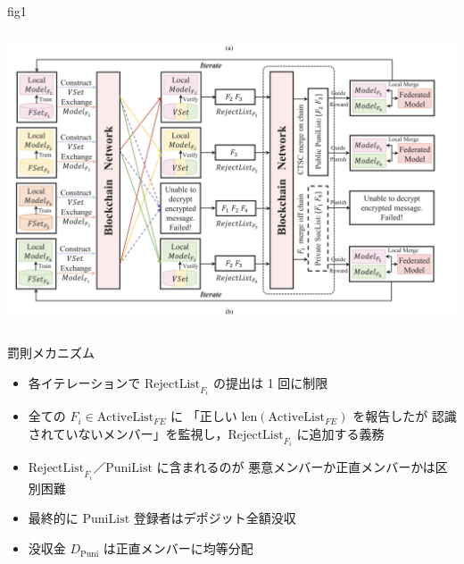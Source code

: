\documentclass[unicode,12pt,aspectratio=169, dvipdfmx]{beamer}
\begin{document}
  \begin{frame}{fig1}
    \begin{columns}
        \begin{column}[T]{.8\linewidth}
            \includegraphics[scale=0.6]{figures/fig1-1.png}                    
        \end{column}
    \end{columns}
\end{frame}



  \begin{frame}{罰則メカニズム}
    \begin{itemize}
      \item 各イテレーションで \(\mathrm{RejectList}_{F_i}\) の提出は 1 回に制限
      \item 全ての \(F_i\in \mathrm{ActiveList}_{FE}\) に
        「正しい \(\mathrm{len}(\mathrm{ActiveList}_{FE})\) を報告したが
        認識されていないメンバー」を監視し，\(\mathrm{RejectList}_{F_i}\) に追加する義務
      \item \(\mathrm{RejectList}_{F_i}\)／\(\mathrm{PuniList}\) に含まれるのが
        悪意メンバーか正直メンバーかは区別困難
      \item 最終的に \(\mathrm{PuniList}\) 登録者はデポジット全額没収
      \item 没収金 \(D_{\mathrm{Puni}}\) は正直メンバーに均等分配
    \end{itemize}
  \end{frame}
  
\end{document}
